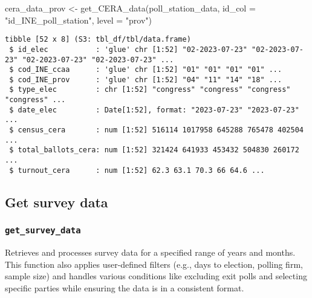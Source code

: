 \documentclass[
  letterpaper,
  DIV=11,
  numbers=noendperiod]{scrreprt}
\newenvironment{Shaded}{\begin{snugshade}}{\end{snugshade}}
\newcommand{\AttributeTok}[1]{\textcolor[rgb]{0.40,0.45,0.13}{#1}}
\newcommand{\FunctionTok}[1]{\textcolor[rgb]{0.28,0.35,0.67}{#1}}
\newcommand{\NormalTok}[1]{\textcolor[rgb]{0.00,0.23,0.31}{#1}}
\newcommand{\OtherTok}[1]{\textcolor[rgb]{0.00,0.23,0.31}{#1}}
\newcommand{\StringTok}[1]{\textcolor[rgb]{0.13,0.47,0.30}{#1}}
\begin{document}
\begin{Shaded}
\begin{Highlighting}[]
\NormalTok{cera\_data\_prov }\OtherTok{\textless{}{-}} \FunctionTok{get\_CERA\_data}\NormalTok{(poll\_station\_data, }
                                 \AttributeTok{id\_col =} \StringTok{"id\_INE\_poll\_station"}\NormalTok{, }
                                 \AttributeTok{level =} \StringTok{"prov"}\NormalTok{)}
\end{Highlighting}
\end{Shaded}

\begin{verbatim}
tibble [52 x 8] (S3: tbl_df/tbl/data.frame)
 $ id_elec           : 'glue' chr [1:52] "02-2023-07-23" "02-2023-07-23" "02-2023-07-23" "02-2023-07-23" ...
 $ cod_INE_ccaa      : 'glue' chr [1:52] "01" "01" "01" "01" ...
 $ cod_INE_prov      : 'glue' chr [1:52] "04" "11" "14" "18" ...
 $ type_elec         : chr [1:52] "congress" "congress" "congress" "congress" ...
 $ date_elec         : Date[1:52], format: "2023-07-23" "2023-07-23" ...
 $ census_cera       : num [1:52] 516114 1017958 645288 765478 402504 ...
 $ total_ballots_cera: num [1:52] 321424 641933 453432 504830 260172 ...
 $ turnout_cera      : num [1:52] 62.3 63.1 70.3 66 64.6 ...
\end{verbatim}

\hypertarget{get-survey-data}{%
\subsection{Get survey data}\label{get-survey-data}}

\hypertarget{get_survey_data}{%
\subsubsection{\texorpdfstring{\texttt{get\_survey\_data}}{get\_survey\_data}}\label{get_survey_data}}

Retrieves and processes survey data for a specified range of years and
months. This function also applies user-defined filters (e.g., days to
election, polling firm, sample size) and handles various conditions like
excluding exit polls and selecting specific parties while ensuring the
data is in a consistent format.
\end{document}
